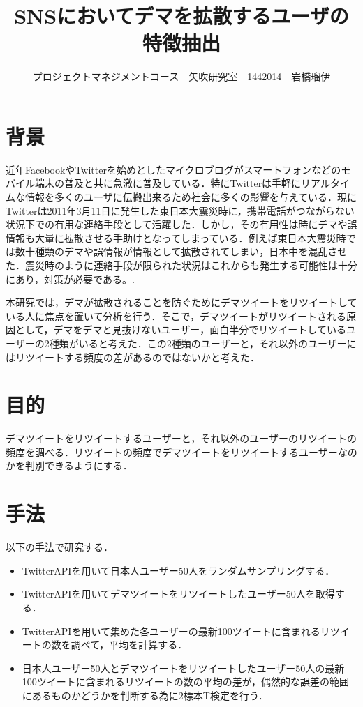\documentclass[uplatex,twocolumn,dvipdfmx]{jsarticle}
\title{\vspace{-5mm}\fontsize{14pt}{0pt}\selectfont SNSにおいてデマを拡散するユーザの特徴抽出}
\author{\normalsize プロジェクトマネジメントコース　矢吹研究室　1442014　岩橋瑠伊}
\date{}
\begin{document}
\fontsize{10.5pt}{\baselineskip}\selectfont
\maketitle





\section{背景}
近年FacebookやTwitterを始めとしたマイクロブログがスマートフォンなどのモバイル端末の普及と共に急激に普及している．特にTwitterは手軽にリアルタイムな情報を多くのユーザに伝搬出来るため社会に多くの影響を与えている．現にTwitterは2011年3月11日に発生した東日本大震災時に，携帯電話がつながらない状況下での有用な連絡手段として活躍した．しかし，その有用性は時にデマや誤情報も大量に拡散させる手助けとなってしまっている．例えば東日本大震災時では数十種類のデマや誤情報が情報として拡散されてしまい，日本中を混乱させた．震災時のように連絡手段が限られた状況はこれからも発生する可能性は十分にあり，対策が必要である。\cite{dema}.

本研究では，デマが拡散されることを防ぐためにデマツイートをリツイートしている人に焦点を置いて分析を行う．そこで，デマツイートがリツイートされる原因として，デマをデマと見抜けないユーザー，面白半分でリツイートしているユーザーの2種類がいると考えた．この2種類のユーザーと，それ以外のユーザーにはリツイートする頻度の差があるのではないかと考えた．

\section{目的}
デマツイートをリツイートするユーザーと，それ以外のユーザーのリツイートの頻度を調べる．リツイートの頻度でデマツイートをリツイートするユーザーなのかを判別できるようにする．

\section{手法}
以下の手法で研究する．
\begin{itemize}
\item TwitterAPIを用いて日本人ユーザー50人をランダムサンプリングする．
\item TwitterAPIを用いてデマツイートをリツイートしたユーザー50人を取得する．
\item TwitterAPIを用いて集めた各ユーザーの最新100ツイートに含まれるリツイートの数を調べて，平均を計算する．
\item 日本人ユーザー50人とデマツイートをリツイートしたユーザー50人の最新100ツイートに含まれるリツイートの数の平均の差が，偶然的な誤差の範囲にあるものかどうかを判断する為に2標本T検定を行う．
\end{itemize}
\end{document}
